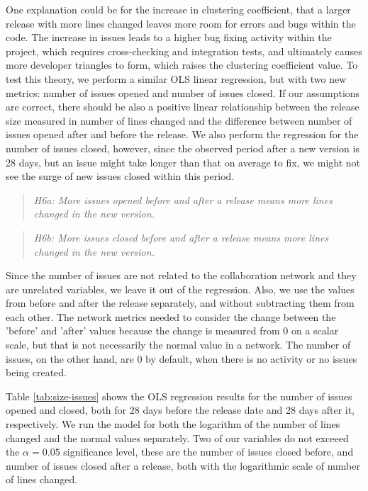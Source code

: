 One explanation could be for the increase in clustering coefficient, that a larger release with more lines changed leaves more room for errors and bugs within the code. The increase in issues leads to a higher bug fixing activity within the project, which requires cross-checking and integration tests, and ultimately causes more developer triangles to form, which raises the clustering coefficient value. To test this theory, we perform a similar OLS linear regression, but with two new metrics: number of issues opened and number of issues closed. If our assumptions are correct, there should be also a positive linear relationship between the release size measured in number of lines changed and the difference between number of issues opened after and before the release. We also perform the regression for the number of issues closed, however, since the observed period after a new version is 28 days, but an issue might take longer than that on average to fix, we might not see the surge of new issues closed within this period.

\begin{quote}
    \textit{H6a: More issues opened before and after a release means more lines changed in the new version.}
\end{quote}

\begin{quote}
    \textit{H6b: More issues closed before and after a release means more lines changed in the new version.}
\end{quote}

Since the number of issues are not related to the collaboration network and they are unrelated variables, we leave it out of the regression. Also, we use the values from before and after the release separately, and without subtracting them from each other. The network metrics needed to consider the change between the 'before' and 'after' values because the change is measured from 0 on a scalar scale, but that is not necessarily the normal value in a network. The number of issues, on the other hand, are 0 by default, when there is no activity or no issues being created.

Table \ref{tab:size-issues} shows the OLS regression results for the number of issues opened and closed, both for 28 days before the release date and 28 days after it, respectively. We run the model for both the logarithm of the number of lines changed and the normal values separately. Two of our variables do not exceeed the $\alpha = 0.05$ significance level, these are the number of issues closed before, and number of issues closed after a release, both with the logarithmic scale of number of lines changed.

